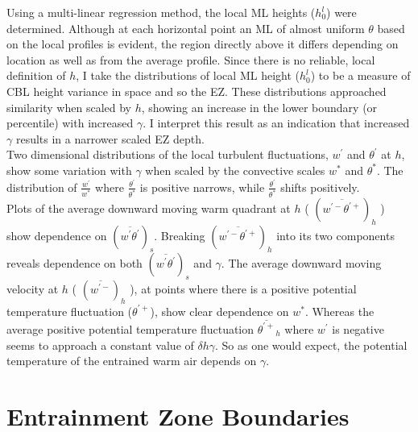 Using a multi-linear regression method, the local \acs{ML} heights ($h^{l}_{0}$) 
were determined.  Although at each horizontal point an \acs{ML} of almost uniform $\theta$ based on the local profiles is evident, the region directly above it differs depending on location as well as from the average profile. 
Since there is no reliable, local definition of $h$, 
I take the distributions of local \acs{ML} height ($h^{l}_{0}$) to be a measure of \acs{CBL} height variance in space and so the \acs{EZ}.
 These distributions approached similarity when scaled by $h$, showing an increase in the lower 
boundary (or percentile) with increased $\gamma$.  I interpret this result as an indication that increased $\gamma$ results in a narrower scaled \acs{EZ} depth.\\

Two dimensional distributions of the local turbulent fluctuations, $w^{'}$ and $\theta^{'}$ at $h$, show some variation with $\gamma$ when scaled by the convective scales $w^{*}$ and $\theta^{*}$.  The distribution of $\frac{w^{'}}{w^{*}}$ where $\frac{\theta^{'}}{\theta^{*}}$ is positive narrows, while $\frac{\theta^{'}}{\theta^{*}}$ shifts positively.\\

Plots of the average downward moving warm quadrant at $h$ ( $(\overline{w^{'-}\theta^{'+}})_{h}$ ) show dependence on $(\overline{w^{'}\theta^{'}})_{s}$. Breaking $(\overline{w^{'-}\theta^{'+}})_{h}$ into its two components reveals dependence on both $(\overline{w^{'}\theta^{'}})_{s}$ and $\gamma$. The average downward moving velocity at $h$ ( $(\overline{w^{'-}})_{h}$ ), at points where there is a positive potential temperature fluctuation ($\theta^{'+}$), show clear dependence on $w^{*}$.  Whereas the average positive potential temperature fluctuation $\overline{\theta^{'+}}_{h}$ where $w^{'}$ is negative seems to approach a constant value of $\delta h \gamma$. So as one would expect, the potential temperature of the entrained warm air depends on $\gamma$.

\clearpage



\section{Entrainment Zone Boundaries}
\label{sec:deltahri}
\FloatBarrier
